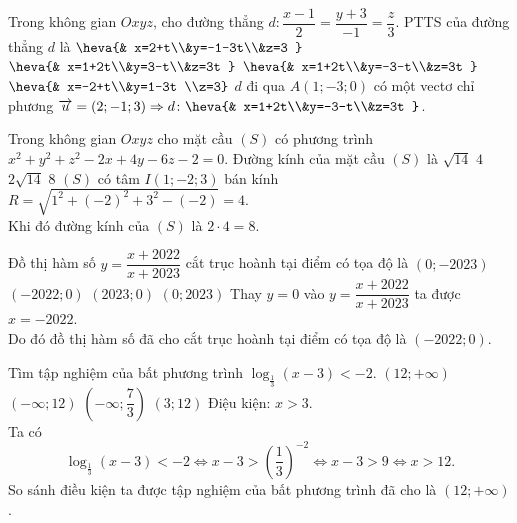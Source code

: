 \begin{ex}%
Trong không gian $Oxyz$, cho đường thẳng $d\colon \dfrac{x-1}{2}=\dfrac{y+3}{-1}=\dfrac{z}{3}$. PTTS của đường thẳng $d$ là
\choice 
{$\heva{& x=2+t\\&y=-1-3t\\&z=3 }$} 
{$\heva{& x=1+2t\\&y=3-t\\&z=3t }$}
{\True $\heva{& x=1+2t\\&y=-3-t\\&z=3t }$} 
{$\heva{& x=-2+t\\&y=1-3t \\z=3}$}
\loigiai
{
$d$ đi qua $A(1;-3;0)$ có một vectơ chỉ phương $\overrightarrow{u}=(2;-1;3)\Rightarrow d\colon\heva{& x=1+2t\\&y=-3-t\\&z=3t }$.
}
\end{ex}

\begin{ex}%
Trong không gian $Oxyz$ cho mặt cầu $(S)$ có phương trình $x^2+y^2+z^2-2x+4y-6z-2=0$. Đường kính của mặt cầu $(S)$ là
\choice 
{$\sqrt{14}$} 
{$4$}
{$2\sqrt{14}$} 
{\True $8$}
\loigiai
{
$(S)$ có tâm $I(1;-2;3)$ bán kính $R=\sqrt{1^2+(-2)^2+3^2-(-2)}=4$.\\
Khi đó đường kính của $(S)$ là $2\cdot 4=8$.
}
\end{ex}

\begin{ex}%
Đồ thị hàm số $y=\dfrac{x+2022}{x+2023}$ cắt trục hoành tại điểm có tọa độ là
\choice 
{$(0;-2023)$} 
{\True $(-2022;0)$}
{$(2023;0)$} 
{$(0;2023)$}
\loigiai
{
Thay $y=0$ vào $y=\dfrac{x+2022}{x+2023}$ ta được $x=-2022$.\\
Do đó đồ thị hàm số đã cho cắt trục hoành tại điểm có tọa độ là $(-2022;0)$.
}
\end{ex}

\begin{ex}%
Tìm tập nghiệm của bất phương trình $\log_{\tfrac{1}{3}}(x-3)<-2$.
\choice 
{\True $(12;+\infty )$} 
{$(-\infty ;12)$}
{$\left (-\infty ;\dfrac{7}{3} \right )$} 
{$(3;12)$}
\loigiai
{
Điệu kiện: $x>3$.\\
Ta có
$$\log_{\tfrac{1}{3}}(x-3)<-2\Leftrightarrow x-3>\left (\dfrac{1}{3} \right )^{-2}\Leftrightarrow x-3>9\Leftrightarrow x>12.$$
So sánh điều kiện ta được tập nghiệm của bất phương trình đã cho là $(12;+\infty )$.
}
\end{ex}


